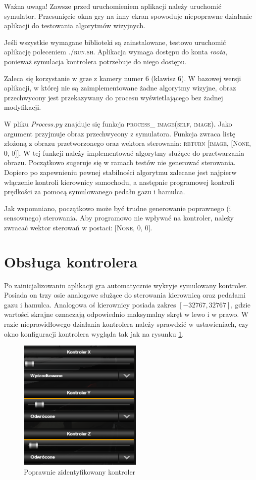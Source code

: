 Ważna uwaga! 
Zawsze przed uruchomieniem aplikacji należy uruchomić symulator. 
Przesunięcie okna gry na inny ekran spowoduje niepoprawne działanie aplikacji do testowania algorytmów wizyjnych.

Jeśli wszystkie wymagane biblioteki są zainstalowane, testowo uruchomić aplikację poleceniem \textsc{./run.sh}. 
Aplikacja wymaga dostępu do konta \textit{roota}, ponieważ symulacja kontrolera potrzebuje do niego dostępu. 

Zaleca się korzystanie w grze z kamery numer 6 (klawisz 6).
W bazowej wersji aplikacji, w której nie są zaimplementowane żadne algorytmy wizyjne, obraz przechwycony jest przekazywany do procesu wyświetlającego bez żadnej modyfikacji. 

W pliku \textit{Process.py} znajduje się funkcja \textsc{process\_ image(self, image)}. 
Jako argument przyjmuje obraz przechwycony z symulatora. 
Funkcja zwraca listę złożoną z obrazu przetworzonego oraz wektora sterowania: \textsc{return [image, [None, 0, 0]]}. 
W tej funkcji należy implementować algorytmy służące do przetwarzania obrazu. 
Początkowo sugeruje się w ramach testów nie generować sterowania. 
Dopiero po zapewnieniu pewnej stabilności algorytmu zalecane jest najpierw włączenie kontroli kierownicy samochodu, a następnie programowej kontroli prędkości za pomocą symulowanego pedału gazu i hamulca.

Jak wspomniano, początkowo może być trudne generowanie poprawnego (i sensownego) sterowania. 
Aby programowo nie wpływać na kontroler, należy zwracać wektor sterowań w postaci: \textsc{[None, 0, 0]}.

\section{Obsługa kontrolera}

Po zainicjalizowaniu aplikacji gra automatycznie wykryje symulowany kontroler. 
Posiada on trzy osie analogowe służące do sterowania kierownicą oraz pedałami gazu i hamulca. 
Analogowa oś kierownicy posiada zakres $[-32767, 32767]$, gdzie wartości skrajne oznaczają odpowiednio maksymalny skręt w lewo i w prawo. 
W razie nieprawidłowego działania kontrolera należy sprawdzić w ustawieniach, czy okno konfiguracji kontrolera wygląda tak jak na rysunku \ref{fig:appendix1_controller}. 


\begin{figure}
  \centering
  \includegraphics[width=6cm]{img/appendix1_controller.png}
  \caption{Poprawnie zidentyfikowany kontroler}
  \label{fig:appendix1_controller}
\end{figure}

